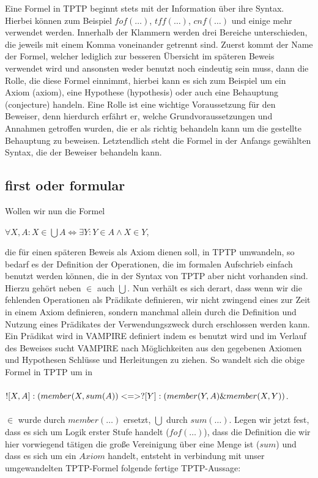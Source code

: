 \documentclass{acm_proc_article-sp-german}
\begin{document}
Eine Formel in TPTP beginnt stets mit der Information über ihre Syntax. Hierbei können zum Beispiel $fof(\dots)$, $tff(\dots)$, $cnf(\dots)$ und einige mehr verwendet werden.
Innerhalb der Klammern werden drei Bereiche unterschieden, die jeweils mit einem Komma voneinander getrennt sind. 
Zuerst kommt der Name der Formel, welcher lediglich zur besseren Übersicht im späteren Beweis verwendet wird und ansonsten weder benutzt noch eindeutig sein muss,
dann die Rolle, die diese Formel einnimmt, hierbei kann es sich zum Beispiel um ein Axiom (axiom), eine Hypothese (hypothesis) oder auch eine Behauptung (conjecture) handeln.
Eine Rolle ist eine wichtige Voraussetzung für den Beweiser, denn hierdurch erfährt er, welche Grundvoraussetzungen und Annahmen getroffen wurden, die er als richtig behandeln kann um die gestellte Behauptung zu beweisen.
Letztendlich steht die Formel in der Anfangs gewählten Syntax, die der Beweiser behandeln kann.

\subsection{first oder formular}
\label{subsec:tptpfof}
Wollen wir nun die Formel

$\forall X,A : X \in \bigcup A \Leftrightarrow \exists Y : Y \in A \land X \in Y$,

die für einen späteren Beweis als Axiom dienen soll,  in TPTP umwandeln, 
so bedarf es der Definition der Operationen, die im formalen Aufschrieb einfach benutzt werden können, 
die in der Syntax von TPTP aber nicht vorhanden sind.
Hierzu gehört neben $\in$ auch  $\bigcup$. 
Nun verhält es sich derart, dass wenn wir die fehlenden Operationen als Prädikate definieren, 
wir nicht zwingend eines zur Zeit in einem Axiom definieren, sondern manchmal allein durch die Definition und Nutzung eines Prädikates der Verwendungszweck durch erschlossen werden kann.
Ein Prädikat wird in VAMPIRE definiert indem es benutzt wird und im Verlauf des Beweises sucht VAMPIRE nach Möglichkeiten aus den gegebenen Axiomen und Hypothesen Schlüsse und Herleitungen zu ziehen.
So wandelt sich die obige Formel in TPTP um in \\ \\
$! [X,A] :( member(X,sum(A)) \\ <=> ? [Y] : ( member(Y,A)  \&  member(X,Y))$. \\ \\
$\in$ wurde durch $member(\dots)$ ersetzt, $\bigcup$ durch $sum(\dots)$.
Legen wir jetzt fest, dass es sich um Logik erster Stufe handelt ($fof(\dots)$), dass die Definition die wir hier vorwiegend tätigen die große Vereinigung über eine Menge ist ($sum$) und dass es sich um ein $Axiom$ handelt,
entsteht in verbindung mit unser umgewandelten TPTP-Formel folgende fertige TPTP-Aussage:
\end{document}
